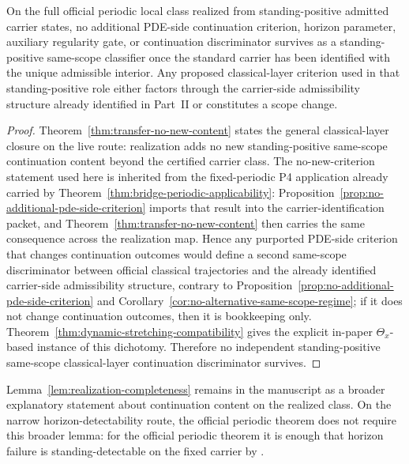 \begin{manualtheorem}
\label{thm:no-independent-classical-discriminator}
On the full official periodic local class realized from standing-positive admitted carrier states, no additional PDE-side continuation criterion, horizon parameter, auxiliary regularity gate, or continuation discriminator survives as a standing-positive same-scope classifier once the standard carrier has been identified with the unique admissible interior. Any proposed classical-layer criterion used in that standing-positive role either factors through the carrier-side admissibility structure already identified in Part~II or constitutes a scope change.
\end{manualtheorem}

\begin{proof}
Theorem~\ref{thm:transfer-no-new-content} states the general classical-layer closure on the live route: realization adds no new standing-positive same-scope continuation content beyond the certified carrier class. The no-new-criterion statement used here is inherited from the fixed-periodic P4 application already carried by Theorem~\ref{thm:bridge-periodic-applicability}: Proposition~\ref{prop:no-additional-pde-side-criterion} imports that result into the carrier-identification packet, and Theorem~\ref{thm:transfer-no-new-content} then carries the same consequence across the realization map. Hence any purported PDE-side criterion that changes continuation outcomes would define a second same-scope discriminator between official classical trajectories and the already identified carrier-side admissibility structure, contrary to Proposition~\ref{prop:no-additional-pde-side-criterion} and Corollary~\ref{cor:no-alternative-same-scope-regime}; if it does not change continuation outcomes, then it is bookkeeping only. Theorem~\ref{thm:dynamic-stretching-compatibility} gives the explicit in-paper $\Theta_x$-based instance of this dichotomy. Therefore no independent standing-positive same-scope classical-layer continuation discriminator survives.
\end{proof}

\begin{remark}
Lemma~\ref{lem:realization-completeness} remains in the manuscript as a broader explanatory statement about continuation content on the realized class. On the narrow horizon-detectability route, the official periodic theorem does not require this broader lemma: for the official periodic theorem it is enough that horizon failure is standing-detectable on the fixed carrier by \HorizonDetectabilityRef{}.
\end{remark}

